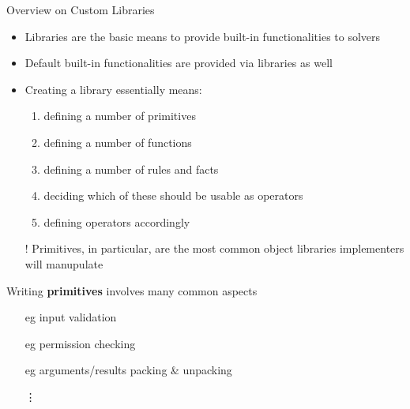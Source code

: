 \documentclass[handout]{beamer}
\begin{document}
\begin{frame}[allowframebreaks]{Overview on Custom Libraries}
    \begin{itemize}
        \item Libraries are the basic means to provide built-in functionalities to solvers

        \bigskip

        \item Default built-in functionalities are provided via libraries as well

        \bigskip

        \item Creating a library essentially means:
        \begin{enumerate}
            \item defining a number of \alert{primitives}
            \item defining a number of \alert{functions}
            \item defining a number of \alert{rules} and \alert{facts}
            \item deciding which of these should be usable as operators
            \item defining \alert{operators} accordingly
        \end{enumerate}

        \bigskip

        \item[!] Primitives, in particular, are the most common object libraries implementers will manupulate
    \end{itemize}

    \framebreak

    \begin{block}{Writing \textbf{primitives} involves many common aspects}
        \begin{itemize}
            \item[eg] input validation
            \item[eg] permission checking
            \item[eg] arguments/results packing \& unpacking
            \item[\vdots]
        \end{itemize}
    \end{block}
\end{frame}
\end{document}
